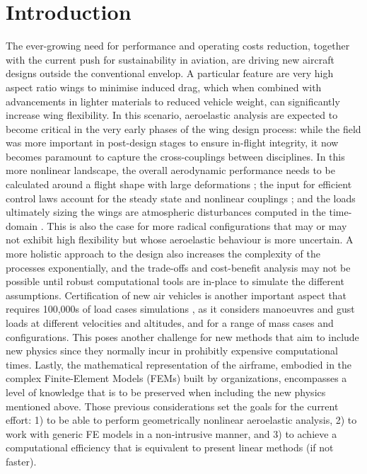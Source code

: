 \documentclass[11pt]{article}
\begin{document}
\section{Introduction}
\label{sec:org7d82869}
The ever-growing need for performance and operating costs reduction, together with the current push for sustainability in aviation, are driving new aircraft designs outside the conventional envelop. A particular feature are very high aspect ratio wings to minimise induced drag, which when combined with advancements in lighter materials to reduced vehicle weight, can significantly increase wing flexibility.  
In this scenario, aeroelastic analysis are expected to become critical in the very early phases of the wing design process: while the field was more important in post-design stages to ensure in-flight integrity, it now becomes paramount to capture the cross-couplings between disciplines.
In this more nonlinear landscape, the overall aerodynamic performance needs to be calculated around a flight shape with large deformations \cite{GRAY2021}; the input for efficient control laws account for the steady state and nonlinear couplings \cite{Artola2021}; and the loads ultimately sizing the wings are atmospheric disturbances computed in the time-domain \cite{CESNIK2014a}.
This is also the case for more radical configurations that may or may not exhibit high flexibility but whose aeroelastic behaviour is more uncertain.
A more holistic approach to the design also increases the complexity of the processes exponentially, and the trade-offs and cost-benefit analysis may not be possible until robust computational tools are in-place to simulate the different assumptions.
 Certification of new air vehicles is another important aspect that requires 100,000s of load cases simulations \cite{Kier2017}, as it considers manoeuvres and gust loads at different velocities and altitudes, and for a range of mass cases and configurations. This poses another challenge for new methods that aim to include new physics since they normally incur in prohibitly expensive computational times.
Lastly, the mathematical representation of the airframe, embodied in the complex Finite-Element Models (FEMs) built by organizations, encompasses a level of knowledge that is to be preserved when including the new physics mentioned above.
Those previous considerations set the goals for the current effort: 1) to be able to perform geometrically nonlinear aeroelastic analysis, 2) to work with generic FE models in a non-intrusive manner, and 3) to achieve a computational efficiency that is equivalent to present linear methods (if not faster).
\end{document}
